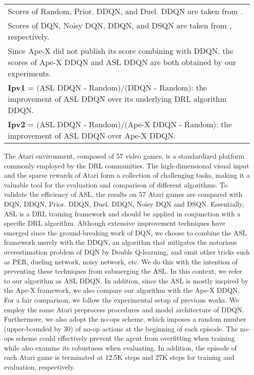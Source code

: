 \documentclass[journal]{IEEEtran}
\begin{document}
\begin{table*}[htbp]
{\begin{tabular}{lrrrrrrrrrrr}
			\hline
			\multicolumn{12}{l}{Scores of Random, Prior. DDQN, and Duel. DDQN are taken from \cite{duel}.  }\\
			\multicolumn{12}{l}{Scores of DQN, Noisy DQN, DDQN, and DSQN are taken from \cite{DQN, DDQN, noisy, DSQN}, respectively. }\\
			\multicolumn{12}{l}{Since Ape-X did not publish its score combining with DDQN, the scores of Ape-X DDQN and ASL DDQN are both obtained by our experiments. }\\
			\multicolumn{12}{l}{\textbf{Ipv1} = (ASL DDQN - Random)/(DDQN - Random): the improvement of ASL DDQN over its underlying DRL algorithm DDQN.}\\
			\multicolumn{12}{l}{\textbf{Ipv2} = (ASL DDQN - Random)/(Ape-X DDQN - Random): the improvement of ASL DDQN over Ape-X DDQN.}\\
	\end{tabular} }
	\label{tab:a57}\end{table*}


The Atari environment, composed of 57 video games, is a standardized platform commonly employed by the DRL communities. The high-dimensional visual input and the sparse rewards of Atari form a collection of challenging tasks, making it a valuable tool for the evaluation and comparison of different algorithms. To validate the efficiency of ASL, the results on 57 Atari games are compared with DQN\cite{DQN}, DDQN\cite{DDQN}, Prior. DDQN\cite{PER}, Duel. DDQN\cite{duel}, Noisy DQN\cite{noisy} and DSQN\cite{DSQN}. Essentially, ASL is a DRL training framework and should be applied in conjunction with a specific DRL algorithm. Although extensive improvement techniques have emerged since the ground-breaking work of DQN, we choose to combine the ASL framework merely with the DDQN, an algorithm that mitigates the notorious overestimation problem of DQN by Double Q-learning, and omit other tricks such as PER, dueling network, noisy network, etc. We do this with the intention of preventing these techniques from submerging the ASL. In this context, we refer to our algorithm as ASL DDQN. In addition, since the ASL is mostly inspired by the Ape-X framework, we also compare our algorithm with the Ape-X DDQN. For a fair comparison, we follow the experimental setup of previous works. We employ the same Atari preprocess procedures and model architecture of DDQN. Furthermore, we also adopt the no-ops scheme, which imposes a random number (upper-bounded by 30) of no-op actions at the beginning of each episode. The no-ops scheme could effectively prevent the agent from overfitting when training while also examine its robustness when evaluating. In addition, the episode of each Atari game is terminated at 12.5K steps and 27K steps for training and evaluation, respectively. 
\end{document}
